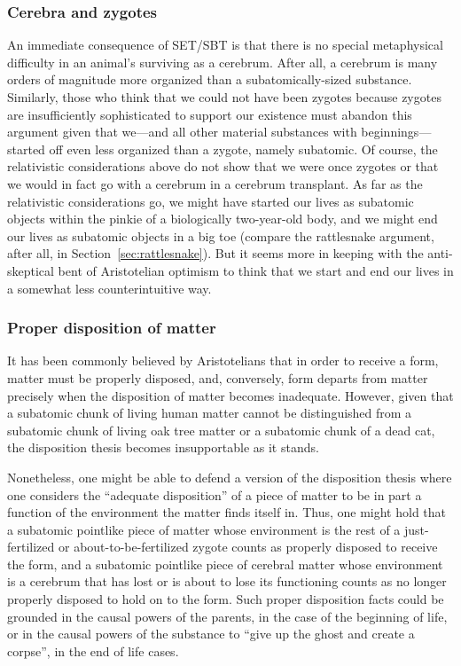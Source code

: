 \subsubsection{Cerebra and zygotes}
An immediate consequence of SET/SBT is that there is no special metaphysical difficulty in an animal's 
surviving as a cerebrum. After all, a cerebrum is many orders of magnitude more organized than a subatomically-sized
substance. Similarly, those who think that we could not have been zygotes because zygotes are insufficiently sophisticated
to support our existence must abandon this argument given that we---and all other material substances with beginnings---started
off even less organized than a zygote, namely subatomic. Of course, the relativistic considerations above do not 
show that we were once zygotes or that we would in fact go with a cerebrum in a cerebrum transplant. As far as the relativistic 
considerations go, we might have started our lives as subatomic objects within the pinkie of a biologically two-year-old 
body, and we might end our lives as subatomic objects in a big toe (compare the rattlesnake argument, after all, in Section~\ref{sec:rattlesnake}).
But it seems more in keeping with the anti-skeptical bent of Aristotelian optimism to think that we start and end our lives 
in a somewhat less counterintuitive way.

\subsubsection{Proper disposition of matter}\label{sec:disposition}
It has been commonly believed by Aristotelians that in order to receive a form, matter must be properly disposed, and,
conversely, form departs from matter precisely when the disposition of matter becomes inadequate. However, given that a subatomic chunk of living human matter cannot be distinguished from a subatomic chunk of living oak tree matter or a subatomic chunk of a dead cat, the disposition thesis becomes insupportable as it stands. 

Nonetheless, one might be able to defend a version of the disposition thesis where one considers the ``adequate disposition'' of 
a piece of matter to be in part a function of the environment the matter finds itself in. Thus, one might hold that a subatomic
pointlike piece of matter whose environment is the rest of a just-fertilized or about-to-be-fertilized zygote counts as 
properly disposed to receive the form, and a subatomic pointlike piece of cerebral matter whose environment is a cerebrum that 
has lost or is about to lose its functioning counts as no longer properly disposed to hold on to the form. Such proper
disposition facts could be grounded in the causal powers of the parents, in the case of the beginning of life, or in the causal 
powers of the substance to ``give up the ghost and create a corpse'', in the end of life cases. 

